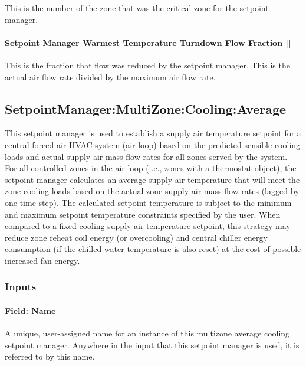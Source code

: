 This is the number of the zone that was the critical zone for the setpoint manager.

\paragraph{Setpoint Manager Warmest Temperature Turndown Flow Fraction {[]}}\label{setpoint-manager-warmest-temperature-turndown-flow-fraction}

This is the fraction that flow was reduced by the setpoint manager. This is the actual air flow rate divided by the maximum air flow rate.

\subsection{SetpointManager:MultiZone:Cooling:Average}\label{setpointmanagermultizonecoolingaverage}

This setpoint manager is used to establish a supply air temperature setpoint for a central forced air HVAC system (air loop) based on the predicted sensible cooling loads and actual supply air mass flow rates for all zones served by the system. For all controlled zones in the air loop (i.e., zones with a thermostat object), the setpoint manager calculates an average supply air temperature that will meet the zone cooling loads based on the actual zone supply air mass flow rates (lagged by one time step). The calculated setpoint temperature is subject to the minimum and maximum setpoint temperature constraints specified by the user. When compared to a fixed cooling supply air temperature setpoint, this strategy may reduce zone reheat coil energy (or overcooling) and central chiller energy consumption (if the chilled water temperature is also reset) at the cost of possible increased fan energy.

\subsubsection{Inputs}\label{inputs-14-013}

\paragraph{Field: Name}\label{field-name-14-008}

A unique, user-assigned name for an instance of this multizone average cooling setpoint manager. Anywhere in the input that this setpoint manager is used, it is referred to by this name.

